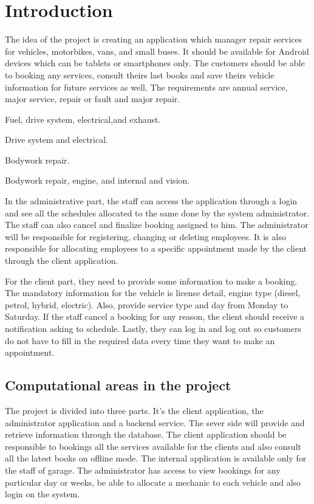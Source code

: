 \chapter{Introduction}

The idea of the project is creating an application which manager repair services for vehicles, motorbikes, vans, and small buses. It should be available for Android devices which can be tablets or smartphones only. The customers should be able to booking any services, consult theirs last books and save theirs vehicle information for future services as well. The requirements are annual service, major service, repair or fault and major repair.

\begin{description}[font=$\bullet$~\normalfont\scshape\color{red!50!black}]
\item [Annual Service] Fuel, drive system, electrical,and  exhaust. 
\item [Major Service] Drive system and electrical.
\item [Repair/ Fault] Bodywork repair.
\item [Major Repair] Bodywork repair, engine, and internal and vision.
\end{description}

In the administrative part, the staff can access the application through a login and see all the schedules allocated to the same done by the system administrator. The staff can also cancel and finalize booking assigned to him. The administrator will be responsible for registering, changing or deleting employees. It is also responsible for allocating employees to a specific appointment made by the client through the client application.

For the client part, they need to provide some information to make a booking. The mandatory information for the vehicle is license detail, engine type (diesel, petrol, hybrid, electric). Also, provide service type and day from Monday to Saturday. If the staff cancel a booking for any reason, the client should receive a notification asking to schedule. Lastly, they can log in and log out so customers do not have to fill in the required data every time they want to make an appointment.

\section{Computational areas in the project}

The project is divided into three parts. It's the client application, the administrator application and a backend service. The sever side will provide and retrieve information through the database. The client application should be responsible to bookings all the services available for the clients and also consult all the latest books on offline mode. The internal application is available only for the staff of garage. The administrator has access  to view bookings for any particular day or weeks, be able to allocate a mechanic to each vehicle and also login on the system. 

